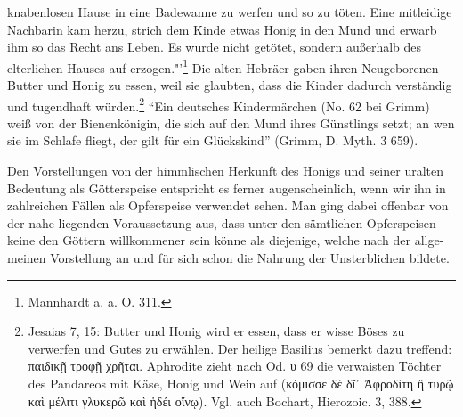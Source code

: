 \documentclass[a4paper, 11pt, oneside]{article}
\begin{document}
knabenlosen Hause in eine Badewanne zu werfen und so zu töten. Eine mitleidige Nachbarin kam herzu, strich dem Kinde etwas Honig in den Mund und erwarb ihm so das Recht ans Leben. Es wurde nicht getötet, sondern außerhalb des elterlichen Hauses auf erzogen."'\footnote{Mannhardt a. a. O. 311.} Die alten Hebräer gaben ihren Neugeborenen Butter und Honig zu essen, weil sie glaubten, dass die Kinder dadurch verständig und tugendhaft würden.\footnote{Jesaias 7, 15: Butter und Honig wird er essen, dass er wisse Böses zu verwerfen und Gutes zu erwählen. Der heilige Basilius bemerkt dazu treffend: παιδικῇ τροφῇ χρῆται. Aphrodite zieht nach Od. υ 69 die verwaisten Töchter des Pandareos mit Käse, Honig und Wein auf (κόμισσε δὲ δῖ᾽ Ἀφροδίτη ἢ τυρῷ καὶ μέλιτι γλυκερῶ καὶ ἡδέι οἴνῳ). Vgl. auch Bochart, Hierozoic. 3, 388.} "`Ein deutsches Kindermärchen (No. 62 bei Grimm) weiß von der Bienenkönigin, die sich auf den Mund ihres Günstlings setzt; an wen sie im Schlafe fliegt, der gilt für ein Glückskind"' (Grimm, D. Myth. 3 659).

Den Vorstellungen von der himmlischen Herkunft des Honigs und seiner uralten Bedeutung als Götterspeise entspricht es ferner augenscheinlich, wenn wir ihn in zahlreichen Fällen als Opferspeise verwendet sehen. Man ging dabei offenbar von der nahe liegenden Voraussetzung aus, dass unter den sämtlichen Opferspeisen keine den Göttern willkommener sein könne als diejenige, welche nach der allge-meinen Vorstellung an und für sich schon die Nahrung der Unsterblichen bildete.
\end{document}
